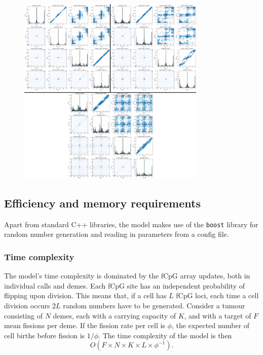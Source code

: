 \begin{figure}[h]
    \centering
    \includegraphics[width=0.8\textwidth]{Chapter_4/figures/sens_fig_2.pdf}
    \caption{}
    \label{fig:sensitivity_analysis_2}
\end{figure}

\subsection{Efficiency and memory requirements}
Apart from standard C++ libraries, the model makes use of the \texttt{boost}
library for random number generation and reading in parameters from a config
file.
\subsubsection{Time complexity}
The model's time complexity is dominated by the fCpG array updates, both in
individual calls and demes. Each fCpG site has an independent probability of
flipping upon division. This means that, if a cell has $L$ fCpG loci, each time
a cell division occurs $2L$ random numbers have to be generated. Consider a
tumour consisting of $N$ demes, each with a carrying capacity of $K$, and with a
target of $F$ mean fissions per deme. If the fission rate per cell is $\phi$, the
expected number of cell births before fission is $1/\phi$.
The time complexity of the model is then
\begin{equation}
    O(F\times N\times K\times L\times\phi^{-1}).
\end{equation}

